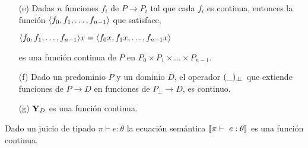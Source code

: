 \begin{proposition}
\begin{enumerate}
\begin{enumerate}
\item[(e)] Dadas $n$ funciones $f_i$ de $P \rightarrow P_i$ tal que cada $f_i$ es continua, entonces
la funci\'on $\langle f_0,f_1,\ldots,f_{n-1} \rangle$ que satisface,

\begin{center}
$\langle f_0,f_1,\ldots,f_{n-1} \rangle x = \langle f_0 x,f_1 x,\ldots,f_{n-1} x \rangle$
\end{center}

es una funci\'on continua de $P$ en $P_0 \times P_1 \times \ldots \times P_{n-1}$.

\item[(f)] Dado un predominio $P$ y un dominio $D$, el operador $(\_)_{\bot \!\!\! \bot}$ que
extiende funciones de $P \rightarrow D$ en funciones de $P_{\bot} \rightarrow D$, es
continuo.

\item[(g)] $\textbf{Y}_{D}$ es una funci\'on continua.

\end{enumerate}

\end{enumerate}

\end{proposition}

\begin{theorem}

Dado un juicio de tipado $\pi \vdash e : \theta$ la ecuaci\'on sem\'antica
$\llbracket \pi \vdash ~ e : \theta \rrbracket$ es una funci\'on continua.

\end{theorem}

